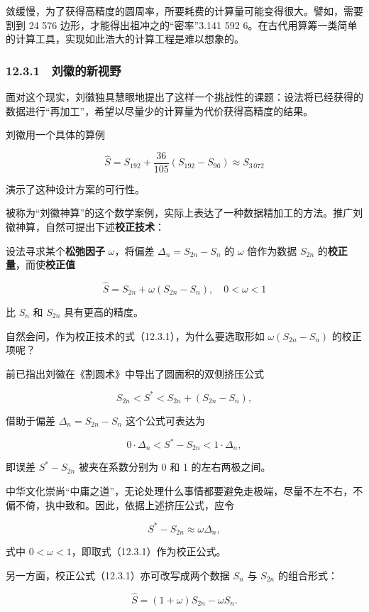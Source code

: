 敛缓慢，为了获得高精度的圆周率，所要耗费的计算量可能变得很大。譬如，需要割到 24 576 边形，才能得出祖冲之的``密率''3.141 592 6。在古代用算筹一类简单的计算工具，实现如此浩大的计算工程是难以想象的。

\subsubsection{12.3.1　刘徽的新视野}\label{ch12-ux5218ux5fbdux7684ux65b0ux89c6ux91ce}

面对这个现实，刘徽独具慧眼地提出了这样一个挑战性的课题：设法将已经获得的数据进行``再加工''，希望以尽量少的计算量为代价获得高精度的结果。

刘徽用一个具体的算例

\[
\widehat S=S_{192}+\frac{36}{105}(S_{192}-S_{96})\approx S_{3\,072}
\]

演示了这种设计方案的可行性。

被称为``刘徽神算''的这个数学案例，实际上表达了一种数据精加工的方法。推广刘徽神算，自然可提出下述\textbf{校正技术}：

设法寻求某个\textbf{松弛因子} \(\omega\)，将偏差 \(\Delta_n=S_{2n}-S_n\) 的 \(\omega\) 倍作为数据 \(S_{2n}\) 的\textbf{校正量}，而使\textbf{校正值}

\[
\widehat S=S_{2n}+\omega(S_{2n}-S_n),\quad 0<\omega<1
\tag{12.3.1}
\]

比 \(S_n\) 和 \(S_{2n}\) 具有更高的精度。

自然会问，作为校正技术的式（12.3.1），为什么要选取形如 \(\omega(S_{2n}-S_n)\) 的校正项呢？

前已指出刘徽在《割圆术》中导出了圆面积的双侧挤压公式

\[
S_{2n}<S^*<S_{2n}+(S_{2n}-S_n),
\]

借助于偏差 \(\Delta_n=S_{2n}-S_n\) 这个公式可表达为

\[
0\cdot\Delta_n<S^*-S_{2n}<1\cdot\Delta_n,
\]

即误差 \(S^*-S_{2n}\) 被夹在系数分别为 0 和 1 的左右两极之间。

中华文化崇尚``中庸之道''，无论处理什么事情都要避免走极端，尽量不左不右，不偏不倚，执中致和。因此，依据上述挤压公式，应令

\[
S^*-S_{2n}\approx\omega\Delta_n,
\]

式中 \(0<\omega<1\)，即取式（12.3.1）作为校正公式。

另一方面，校正公式（12.3.1）亦可改写成两个数据 \(S_n\) 与 \(S_{2n}\) 的组合形式：

\[
\widehat S=(1+\omega)S_{2n}-\omega S_n.
\]

